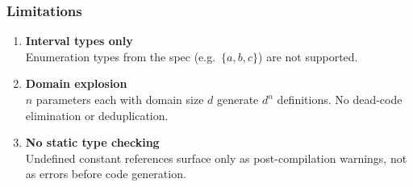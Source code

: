 \documentclass[t]{beamer}
\begin{document}
  \begin{frame}
    \frametitle{Limitations}

    \begin{enumerate}

      \item \textbf{Interval types only} \\
            Enumeration types from the spec (e.g.\ $\{a, b, c\}$) are not supported.

      \vspace{0.2cm}

      \item \textbf{Domain explosion} \\
            $n$ parameters each with domain size $d$ generate $d^n$ definitions.
            No dead-code elimination or deduplication.

      \vspace{0.2cm}

      \item \textbf{No static type checking} \\
            Undefined constant references surface only as post-compilation
            warnings, not as errors before code generation.

    \end{enumerate}

  \end{frame}
\end{document}
